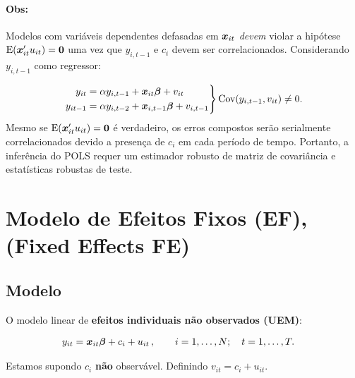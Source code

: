 \documentclass[11pt, oneside, a4paper, article]{article}
\numberwithin{equation}{section}
\begin{document}
\paragraph{Obs:}
Modelos com variáveis dependentes defasadas em $\boldsymbol{x}_{it}$ \textit{devem} violar a hipótese $\text{E}(\boldsymbol{x}_{it}'u_{it} ) = \boldsymbol{0}$ uma vez que $y_{i, t-1}$ e $c_{i}$ devem ser correlacionados.
Considerando $y_{i, t-1}$ como regressor:

\vspace{-1 em}
\begin{align*}
	\left.
		\begin{aligned}
			y_{it} &= \alpha y_{i, t-1} + \boldsymbol{x}_{it} \boldsymbol{\beta} + v_{it}
			\\
			y_{it-1} &= \alpha y_{i, t-2} + \boldsymbol{x}_{i,t-1} \boldsymbol{\beta} + v_{i,t-1}
		\end{aligned}
	\right\}
	\text{Cov}(y_{i, t-1}, v_{it}) \neq 0.
\end{align*}
Mesmo se $\text{E}(\boldsymbol{x}_{it}'u_{it} ) = \boldsymbol{0}$  é verdadeiro, os erros compostos serão serialmente correlacionados devido a presença de $c_{i}$ em cada período de tempo.
Portanto, a inferência do POLS requer um estimador robusto de matriz de covariância e estatísticas robustas de teste.

\clearpage
\section{Modelo de Efeitos Fixos (EF), (Fixed Effects FE)}
\noindent
\citet[Sec.10.5 -- Fixed Effects Methods, p.265]{wool-2010}

\subsection{Modelo}

O modelo linear de \textbf{efeitos individuais não observados (UEM)}:

\vspace{-1 em}
\begin{align} \label{fe:mod:1}
	y_{it} &= \boldsymbol{x}_{it} \boldsymbol{\beta} + c_{i} + u_{it} 
	\, , \qquad	i = 1, \dots, N; \quad t = 1, \dots, T.
\end{align}

\noindent
Estamos supondo $c_{i}$ \textbf{não} observável.
Definindo $v_{it} = c_{i} + u_{it}$.
\end{document}
